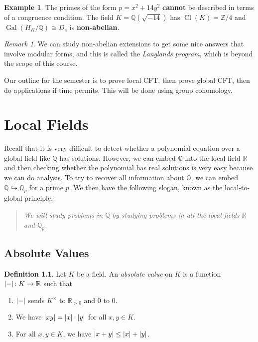 \documentclass[leqno, openany]{memoir}
\theoremstyle{definition}
\newtheorem{defn}[thm]{Definition}
\newtheorem{exm}[thm]{Example}
\theoremstyle{remark}
\newtheorem{rmk}[thm]{Remark}
\theoremstyle{plain}
\theoremstyle{definition}
\theoremstyle{remark}
\newcommand{\R}{\mathbb{R}}
\newcommand{\Z}{\mathbb{Z}}
\newcommand{\Q}{\mathbb{Q}}
\DeclareMathOperator{\Gal}{Gal}
\DeclareMathOperator{\Cl}{Cl}
\begin{document}
\begin{exm}
    The primes of the form $p = x^2 + 14 y^2$ \textbf{cannot} be described in terms of a congruence condition. The field $K = \Q(\sqrt{-14})$ has $\Cl(K) = \Z/4$ and $\Gal(H_K/\Q) \cong D_4$ is \textbf{non-abelian}. 
\end{exm}

\begin{rmk}
    We can study non-abelian extensions to get some nice answers that involve modular forms, and this is called the \textit{Langlands program}, which is beyond the scope of this course. 
\end{rmk}

Our outline for the semester is to prove local CFT, then prove global CFT, then do applications if time permits. This will be done using group cohomology.

\chapter{Local Fields}%
\label{cha:local_fields}

Recall that it is very difficult to detect whether a polynomial equation over a global field like $\Q$ has solutions. However, we can embed $\Q$ into the local field $\R$ and then checking whether the polynomial has real solutions is very easy because we can do analysis. To try to recover all information about $\Q$, we can embed $\Q \hookrightarrow \Q_p$ for a prime $p$. We then have the following slogan, known as the local-to-global principle:

\begin{quotation}
\itshape We will study problems in $\Q$ by studying problems in all the local fields $\R$ and $\Q_p$.
\end{quotation}

\section{Absolute Values}%
\label{sec:absolute_values}

\begin{defn}
    Let $K$ be a field. An \textit{absolute value} on $K$ is a function $\abs{-} \colon K \to \R$ such that
    \begin{enumerate}
        \item $\abs{-}$ sends $K^{\times}$ to $\R_{>0}$ and $0$ to $0$.
        \item We have $\abs{xy} = \abs{x} \cdot \abs{y}$ for all $x,y \in K$.
        \item For all $x,y \in K$, we have $\abs{x+y} \leq \abs{x} + \abs{y}$.
    \end{enumerate}
\end{defn}
\end{document}
